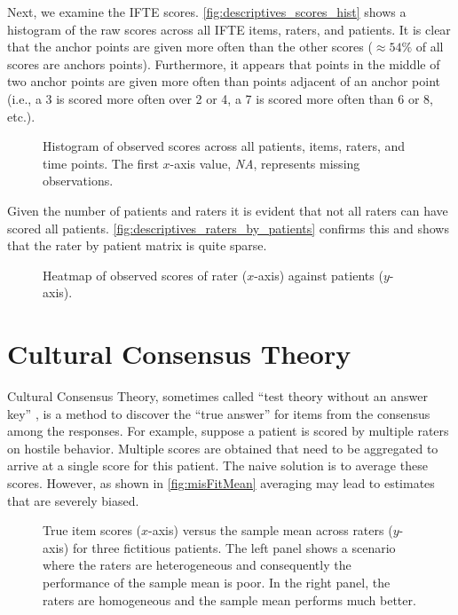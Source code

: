\documentclass[a4paper,11pt]{article}
\begin{document}
Next, we examine the IFTE scores. 
\autoref{fig:descriptives_scores_hist} shows a histogram of the raw scores across all IFTE items, raters, and patients.
It is clear that the anchor points are given more often than the other scores ($\approx54\%$ of all scores are anchors points).
Furthermore, it appears that points in the middle of two anchor points are given more often than points adjacent of an anchor point (i.e., a 3 is scored more often over 2 or 4, a 7 is scored more often than 6 or 8, etc.).
\begin{figure}[!ht]
	\centering
	
	\caption{Histogram of observed scores across all patients, items, raters, and time points. The first $x$-axis value, \emph{NA}, represents missing observations.}
	\label{fig:descriptives_scores_hist}
\end{figure}
Given the number of patients and raters it is evident that not all raters can have scored all patients.
\autoref{fig:descriptives_raters_by_patients} confirms this and shows that the rater by patient matrix is quite sparse.
\begin{figure}[!ht]
	\centering
	
	\caption{Heatmap of observed scores of rater ($x$-axis) against patients ($y$-axis).}
	\label{fig:descriptives_raters_by_patients}
\end{figure}



\section{Cultural Consensus Theory}

Cultural Consensus Theory, sometimes called ``test theory without an answer key'' \parencite{batchelder1988test}, is a method to discover the ``true answer'' for items from the consensus among the responses.
For example, suppose a patient is scored by multiple raters on hostile behavior.
Multiple scores are obtained that need to be aggregated to arrive at a single score for this patient.
The naive solution is to average these scores.
However, as shown in \autoref{fig:misFitMean} averaging may lead to estimates that are severely biased.
\begin{figure}[!ht]
	\centering
	
	\caption{True item scores ($x$-axis) versus the sample mean across raters ($y$-axis) for three fictitious patients. The left panel shows a scenario where the raters are heterogeneous and consequently the performance of the sample mean is poor. In the right panel, the raters are homogeneous and the sample mean performs much better.}
	\label{fig:misFitMean}
\end{figure}
\end{document}

